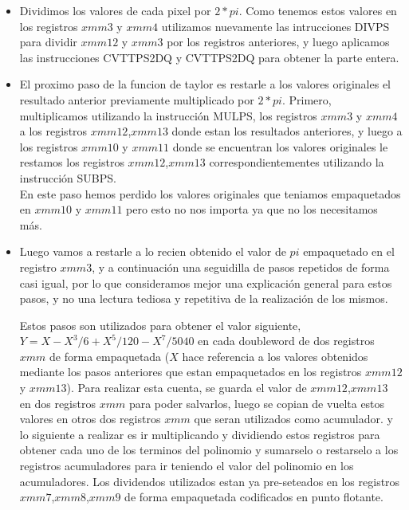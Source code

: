 \begin{itemize}
	\begin{itemize}
		\item Dividimos los valores de cada pixel por $2*pi$. Como tenemos estos valores en los registros $xmm3$ y $xmm4$ utilizamos nuevamente las intrucciones DIVPS para dividir $xmm12$ y $xmm3$ por los registros anteriores, y luego aplicamos las instrucciones CVTTPS2DQ y CVTTPS2DQ para obtener la parte entera.

		\item El proximo paso de la funcion de taylor es restarle a los valores originales el resultado anterior previamente multiplicado por $2*pi$. Primero, multiplicamos utilizando la instrucción MULPS, los registros $xmm3$ y $xmm4$ a los registros $xmm12$,$xmm13$ donde estan los resultados anteriores, y luego a los registros $xmm10$ y $xmm11$ donde se encuentran los valores originales le restamos los registros $xmm12$,$xmm13$ correspondientementes utilizando la instrucción  SUBPS.\\
		En este paso hemos perdido los valores originales que teniamos empaquetados en $xmm10$ y $xmm11$ pero esto no nos importa ya que no los necesitamos más.

		\item Luego vamos a restarle a lo recien obtenido el valor de $pi$ empaquetado en el registro $xmm3$, y a continuación una seguidilla de pasos repetidos de forma casi igual, por lo que consideramos mejor una explicación general para estos pasos, y no una lectura tediosa y repetitiva de la realización de los mismos.

		Estos pasos son utilizados para obtener el valor siguiente, $Y = X - X^3/6 + X^5/120 - X^7/5040$ en cada doubleword de dos registros $xmm$ de forma empaquetada ($X$ hace referencia a los valores obtenidos mediante los pasos anteriores que estan empaquetados en los registros $xmm12$ y $xmm13$).
		Para realizar esta cuenta, se guarda el valor de $xmm12$,$xmm13$ en dos registros $xmm$ para poder salvarlos, luego se copian de vuelta estos valores en otros dos registros $xmm$ que seran utilizados como acumulador. y lo siguiente a realizar es ir multiplicando y dividiendo estos registros para obtener cada uno de los terminos del polinomio y sumarselo o restarselo a los registros acumuladores para ir teniendo el valor del polinomio en los acumuladores. Los dividendos utilizados estan ya pre-seteados en los registros $xmm7$,$xmm8$,$xmm9$ de forma empaquetada codificados en punto flotante.
	\end{itemize}


\end{itemize}
